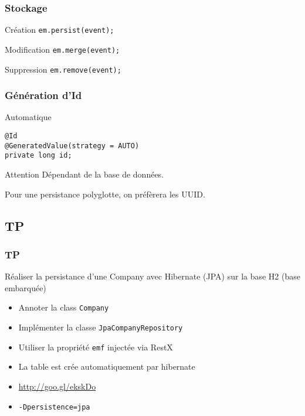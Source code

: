 \documentclass[t,12pt]{beamer}
\begin{document}
\begin{frame}
	\frametitle{Stockage}

	\begin{exampleblock}{Cr\'eation}
		\lstinline{em.persist(event);}
	\end{exampleblock}

	\begin{block}{Modification}
		\lstinline{em.merge(event);}
	\end{block}

	\begin{alertblock}{Suppression}
		\lstinline{em.remove(event);}
	\end{alertblock}
\end{frame}

\begin{frame}[fragile]
	\frametitle{G\'en\'eration d'Id}

	\begin{block}{Automatique}
		\begin{lstlisting}[frame=none]
@Id
@GeneratedValue(strategy = AUTO)
private long id;
		\end{lstlisting}
	\end{block}

	\begin{alertblock}{Attention}
		D\'ependant de la base de donn\'ees.

		Pour une persistance polyglotte, on pr\'ef\`erera les UUID.
	\end{alertblock}
\end{frame}

\subsection{TP}

\begin{frame}
	\frametitle{TP}

	\begin{block}{R\'ealiser la persistance d'une Company avec Hibernate (JPA) sur la base H2 (base embarqu\'ee)}
		\begin{itemize}
			\item Annoter la class \lstinline{Company}
			\item Impl\'ementer la classe \lstinline{JpaCompanyRepository}
			\item Utiliser la propri\'et\'e \lstinline{emf} inject\'ee via RestX
			\item La table est cr\'ee automatiquement par hibernate
			\item \url{http://goo.gl/ekskDo}
			\item \lstinline{-Dpersistence=jpa}
		\end{itemize}
	\end{block}
\end{frame}
\end{document}
